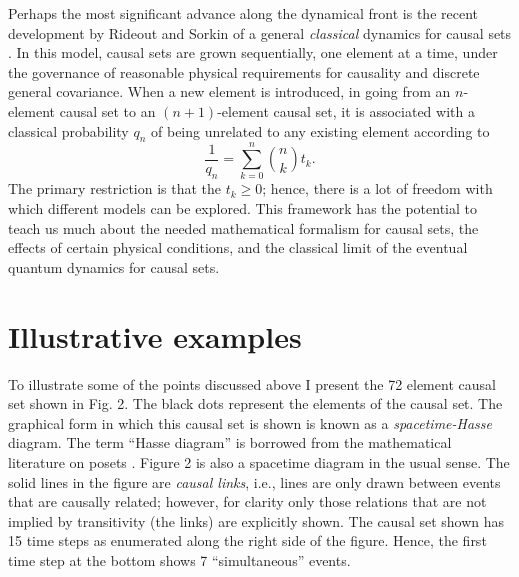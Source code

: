 \documentclass[aps,amssymb,12pt]{revtex4-2}
\begin{document}
Perhaps the most significant advance along the dynamical front is the recent
development by Rideout and Sorkin of a general {\it classical} dynamics for
causal sets \cite{27}. In this model, causal sets are grown sequentially, one
element at a time, under the governance of reasonable physical requirements
for causality and discrete general covariance. When a new element is
introduced, in going from an $n$-element causal set to an $(n+1)$-element
causal set, it is associated with a classical probability $q_n$ of being
unrelated to any existing element according to
\[
\frac 1{q_n}=\sum\limits_{k=0}^n%
{n \choose k}%
t_k.
\]
The primary restriction is that the $t_k\geq 0$; hence, there is a lot of
freedom with which different models can be explored. This framework has the
potential to teach us much about the needed mathematical formalism for
causal sets, the effects of certain physical conditions, and the classical
limit of the eventual quantum dynamics for causal sets.

\section{Illustrative examples}

To illustrate some of the points discussed above I present the 72 element
causal set shown in Fig. 2. The black dots represent the elements of the
causal set. The graphical form in which this causal set is shown is known as
a {\it spacetime-Hasse} diagram. The term ``Hasse diagram'' is borrowed from
the mathematical literature on posets \cite{23}. Figure 2 is also a spacetime
diagram in the usual sense. The solid lines in the figure are {\it causal
links}, i.e., lines are only drawn between events that are causally related;
however, for clarity only those relations that are not implied by
transitivity (the links) are explicitly shown. The causal set shown has 15
time steps as enumerated along the right side of the figure. Hence, the
first time step at the bottom shows 7 ``simultaneous'' events.
\end{document}
